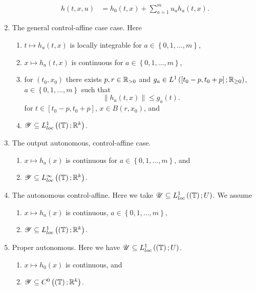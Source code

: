 \begin{enumerate}
\begin{align*}
	h\left( t, x , u \right) &= h_0 \left( t, x  \right) + \sum_{a=1}^{m} u_{a} h_a \left( t, x \right)  
.\end{align*} 
\item  The general control-affine case case. Here
	\begin{enumerate}
		\item $t \longmapsto h_a \left( t, x  \right) $ is locally integrable for $a \in  \left\{ 0, 1, \ldots , m \right\} $, 
		\item $x \longmapsto h_{a}\left( t, x \right)$ is continuous for $a \in  \left\{ 0, 1, \ldots, m \right\} $, 
		\item for $\left( t_0, x_0 \right) $ there exists $p, r \in \mathbb{R}_{>0}$ and $g_{a}\in  L^{1}\left( \left[ t_0 - p, t_0 + p \right] ; \mathbb{R}_{\ge 0} \right) $, $a \in  \left\{ 0, 1, \ldots , m \right\} $ such that 
			\[
				\|h_{a}\left( t, x \right) \|\le  g_{a}\left( t \right) 
			.\] 
			for $t \in \left[ t_0 - p, t_0 + p \right] $, $x \in B\left( r, x_0 \right) $, and 
		\item $\mathscr{Y} \subseteq L^{1}_{loc}\left( \left( \mathbb{T} \right) ; \mathbb{R}^{k} \right) $.
	\end{enumerate}
\item The output autonomous, control-affine case. 
	\begin{enumerate}
		\item $x \longmapsto h_{a}\left( x \right) $ is continuous for $a \in \left\{ 0, 1, \ldots , m \right\} $, and 
		\item $\mathscr{Y} \subseteq L^{\infty}_{loc}\left( \left( \mathbb{T} \right) ; \mathbb{R}^{k} \right) $. 
	\end{enumerate}
\item The autonomous control-affine. Here we take $\mathscr{U} \subseteq L^{1}_{loc}\left( \left( \mathbb{T} \right) ; U \right) $. We assume 
	\begin{enumerate}
		\item $x \longmapsto h _{a}\left( x \right) $ is continuous, $a \in \left\{ 0, 1, \ldots, m \right\}$,  
		\item $\mathscr{Y} \subseteq L^{1}_{loc}\left( \left( \mathbb{T} \right) ; \mathbb{R}^{k} \right) $.
	\end{enumerate}
\item Proper autonomous. Here we have $\mathscr{U} \subseteq L^{1}_{loc}\left( \left( \mathbb{T} \right) ; U \right) $. 
	\begin{enumerate}
		\item  $x \longmapsto h_0 \left( x \right) $ is continuous, and 
		\item $\mathscr{Y} \subseteq C^{0}\left( \left( \mathbb{T} \right) ; \mathbb{R}^{k} \right) $.
	\end{enumerate}
\end{enumerate}

